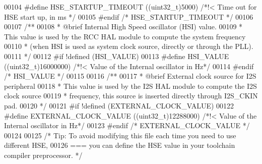 \begin{DoxyCode}
00104   \textcolor{preprocessor}{#}\textcolor{preprocessor}{define} \textcolor{preprocessor}{HSE\_STARTUP\_TIMEOUT}    \textcolor{preprocessor}{(}\textcolor{preprocessor}{(}\textcolor{preprocessor}{uint32\_t}\textcolor{preprocessor}{)}5000\textcolor{preprocessor}{)}   \textcolor{comment}{/*!< Time out for HSE start up, in ms */}
00105 \textcolor{preprocessor}{#}\textcolor{preprocessor}{endif} \textcolor{comment}{/* HSE\_STARTUP\_TIMEOUT */}
00106 
00107 \textcolor{comment}{/**}
00108 \textcolor{comment}{  * @brief Internal High Speed oscillator (HSI) value.}
00109 \textcolor{comment}{  *        This value is used by the RCC HAL module to compute the system frequency}
00110 \textcolor{comment}{  *        (when HSI is used as system clock source, directly or through the PLL). }
00111 \textcolor{comment}{  */}
00112 \textcolor{preprocessor}{#}\textcolor{preprocessor}{if} \textcolor{preprocessor}{!}\textcolor{preprocessor}{defined}  \textcolor{preprocessor}{(}HSI_VALUE\textcolor{preprocessor}{)}
00113   \textcolor{preprocessor}{#}\textcolor{preprocessor}{define} \textcolor{preprocessor}{HSI\_VALUE}    \textcolor{preprocessor}{(}\textcolor{preprocessor}{(}\textcolor{preprocessor}{uint32\_t}\textcolor{preprocessor}{)}16000000\textcolor{preprocessor}{)} \textcolor{comment}{/*!< Value of the Internal oscillator in Hz*/}
00114 \textcolor{preprocessor}{#}\textcolor{preprocessor}{endif} \textcolor{comment}{/* HSI\_VALUE */}
00115 
00116 \textcolor{comment}{/**}
00117 \textcolor{comment}{  * @brief External clock source for I2S peripheral}
00118 \textcolor{comment}{  *        This value is used by the I2S HAL module to compute the I2S clock source }
00119 \textcolor{comment}{  *        frequency, this source is inserted directly through I2S\_CKIN pad. }
00120 \textcolor{comment}{  */}
00121 \textcolor{preprocessor}{#}\textcolor{preprocessor}{if} \textcolor{preprocessor}{!}\textcolor{preprocessor}{defined}  \textcolor{preprocessor}{(}\textcolor{preprocessor}{EXTERNAL\_CLOCK\_VALUE}\textcolor{preprocessor}{)}
00122   \textcolor{preprocessor}{#}\textcolor{preprocessor}{define} \textcolor{preprocessor}{EXTERNAL\_CLOCK\_VALUE}    \textcolor{preprocessor}{(}\textcolor{preprocessor}{(}\textcolor{preprocessor}{uint32\_t}\textcolor{preprocessor}{)}12288000\textcolor{preprocessor}{)} \textcolor{comment}{/*!< Value of the Internal oscillator in Hz*/}
00123 \textcolor{preprocessor}{#}\textcolor{preprocessor}{endif} \textcolor{comment}{/* EXTERNAL\_CLOCK\_VALUE */}
00124 
00125 \textcolor{comment}{/* Tip: To avoid modifying this file each time you need to use different HSE,}
00126 \textcolor{comment}{   ===  you can define the HSE value in your toolchain compiler preprocessor. */}

\end{DoxyCode}
